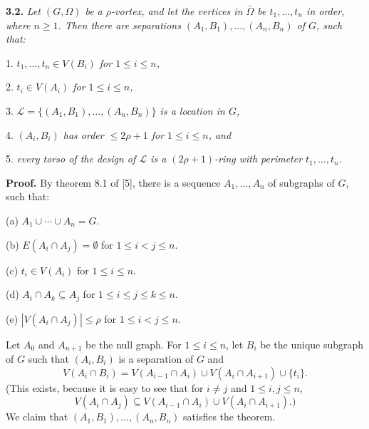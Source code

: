 \textbf{3.2.} \textit{Let $(G, \Omega)$ be a $\rho$-vortex, and let the vertices in $\bar{\Omega}$ be $t_1, \ldots, t_n$ in order, where $n \ge 1$. Then there are separations $(A_1, B_1), \ldots, (A_n, B_n)$ of $G$, such that:}

\hspace*{12pt}1. \textit{$t_1, \ldots, t_n \in V(B_i)$ for $1 \le i \le n$,}

\hspace*{12pt}2. \textit{$t_i \in V(A_i)$ for $1 \le i \le n$,}

\hspace*{12pt}3. \textit{$\mathscr{L} = \{(A_1, B_1), \ldots, (A_n, B_n)\}$ is a location in $G$,}

\hspace*{12pt}4. \textit{$(A_i, B_i)$ has order $\le 2\rho + 1$ for $1 \le i \le n$, and}

\hspace*{12pt}5. \textit{every torso of the design of $\mathscr{L}$ is a $(2\rho + 1)$-ring with perimeter $t_1, \ldots, t_n$.}

\textbf{Proof.} By theorem 8.1 of [5], there is a sequence $A_1, \ldots, A_n$ of subgraphs of $G$, such that:

\hspace*{12pt}(a) $A_1 \cup \cdots \cup A_n = G$.

\hspace*{12pt}(b) $E(A_i \cap A_j) = \emptyset$ for $1 \le i < j \le n$.

\hspace*{12pt}(c) $t_i \in V(A_i)$ for $1 \le i \le n$.

\hspace*{12pt}(d) $A_i \cap A_k \subseteq A_j$ for $1 \le i \le j \le k \le n$.

\hspace*{12pt}(e) $|V(A_i \cap A_j)| \le \rho$ for $1 \le i < j \le n$.

Let $A_0$ and $A_{n+1}$ be the null graph. For $1 \le i \le n$, let $B_i$ be the unique subgraph of $G$ such that $(A_i, B_i)$ is a separation of $G$ and
\begin{equation*}
V(A_i \cap B_i) = V(A_{i-1} \cap A_i) \cup V(A_i \cap A_{i+1}) \cup \{t_i\}.
\end{equation*}
(This exists, because it is easy to see that for $i \ne j$ and $1 \le i, j \le n$,
\begin{equation*}
V(A_i \cap A_j) \subseteq V(A_{i-1} \cap A_i) \cup V(A_i \cap A_{i+1}).)
\end{equation*}
We claim that $(A_1, B_1), \ldots, (A_n, B_n)$ satisfies the theorem.


